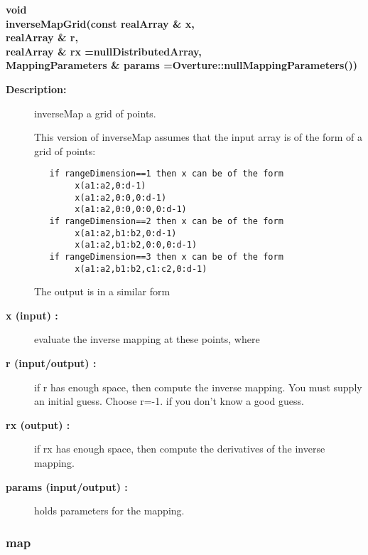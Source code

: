 \begin{flushleft} \textbf{%
void  \\ 
\settowidth{\MappingIncludeArgIndent}{inverseMapGrid(}%
inverseMapGrid(const realArray \& x, \\ 
\hspace{\MappingIncludeArgIndent}realArray \& r, \\ 
\hspace{\MappingIncludeArgIndent}realArray \& rx  =nullDistributedArray,\\ 
MappingParameters \& params  =Overture::nullMappingParameters())
}\end{flushleft}
\begin{description}
\item[{\bf Description:}]  inverseMap a grid of points.
 
 This version of inverseMap assumes that the input array is of the form of a grid of points:
 \begin{verbatim}
   if rangeDimension==1 then x can be of the form
        x(a1:a2,0:d-1)             
        x(a1:a2,0:0,0:d-1)        
        x(a1:a2,0:0,0:0,0:d-1)   
   if rangeDimension==2 then x can be of the form
        x(a1:a2,b1:b2,0:d-1)             
        x(a1:a2,b1:b2,0:0,0:d-1)      
   if rangeDimension==3 then x can be of the form
        x(a1:a2,b1:b2,c1:c2,0:d-1)      

 \end{verbatim}
 The output is in a similar form

\item[{\bf x (input) :}]  evaluate the inverse mapping at these points, where
\item[{\bf r  (input/output) :}]  if r has enough space, then compute the inverse mapping. You must supply an initial guess.
       Choose r=-1. if you don't know a good guess. 
\item[{\bf rx (output) :}]  if rx has enough space, then  compute the derivatives of the inverse mapping.
\item[{\bf params (input/output) :}]  holds parameters for the mapping.
\end{description}
\subsubsection{map}
 
